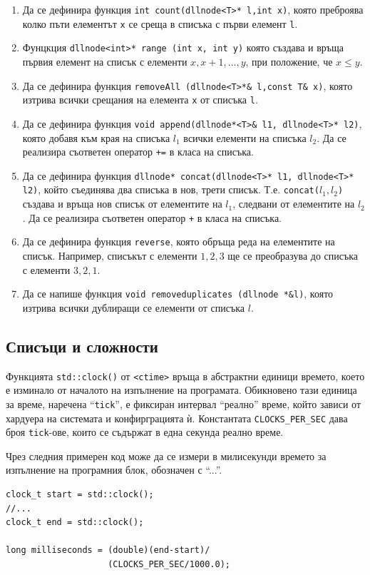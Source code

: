 \documentclass[12pt,a4paper]{article}
\newcommand{\code}[1]{\texttt{#1}}
\begin{document}
\begin{enumerate}[resume]

	\item  Да се дефинира функция \code{int count(dllnode<T>* l,int x)}, която преброява колко пъти елементът \code{x} се среща в списъка с първи елемент \code{l}.
	\item  Фунцкция \code{dllnode<int>* range (int x, int y)} която създава и връща първия елемент на списък с елементи $x, x+1, ..., y$, при положение, че $x \leq y$.
	\item  Да се дефинира функция \code{removeAll (dllnode<T>*\& l,const T\& x)}, която изтрива всички срещания на елемента \code{x} от списъка \code{l}.
	\item  Да се дефинира функция \code{void append(dllnode*<T>\& l1, dllnode<T>* l2)}, която добавя към края на списъка $l_1$ всички елементи на списъка $l_2$. Да се реализира съответен оператор \texttt{+=} в класа на списъка.
	\item  Да се дефинира функция \code{dllnode* concat(dllnode<T>* l1, dllnode<T>* l2)}, който съединява два списъка в нов, трети списък. Т.е. \code{concat($l_1,l_2$)} създава и връща нов списък от елементите на \code{$l_1$}, следвани от елементите на \code{$l_2$}. Да се реализира съответен оператор \texttt{+} в класа на списъка.
	\item  Да се дефинира функция \code{reverse}, която обръща реда на елементите на списък. Например, списъкът с елементи $1,2,3$ ще се преобразува до списъка с елементи $3,2,1$.
	\item Да се напише функция \code{void removeduplicates (dllnode *\&l)}, която изтрива всички дублиращи се елементи от списъка $l$.
\end{enumerate}

\subsection {Списъци и сложности}
\label{timing}
\begin{mdframed}[hidealllines=true,backgroundcolor=gray!20]
Функцията \code{std::clock()} от \code{<ctime>} връща в абстрактни единици времето, което е изминало от началото на изпълнение на програмата. Обикновено тази единица за време, наречена ``\code{tick}'', е фиксиран интервал ``реално'' време, който зависи от хардуера на системата и конфирграцията ѝ. Константата \code{CLOCKS\_PER\_SEC} дава броя \code{tick}-ове, които се съдържат в една секунда реално време.

Чрез следния примерен код може да се измери в милисекунди времето за изпълнение на програмния блок, обозначен с ``...''.
\begin{verbatim}
clock_t start = std::clock();
//...
clock_t end = std::clock();

long milliseconds = (double)(end-start)/
                    (CLOCKS_PER_SEC/1000.0);

\end{verbatim}
\end{mdframed}
\end{document}
